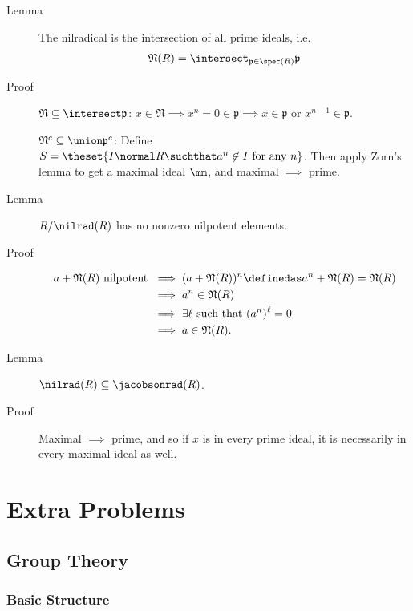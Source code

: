 \begin{description}
\item[Lemma]
The nilradical is the intersection of all prime ideals, i.e.
\begin{align*}
  \mathfrak{N}(R) = \intersect_{\mathfrak{p} \in \spec(R)} \mathfrak{p}
  \end{align*}
\item[Proof]
\(\mathfrak{N} \subseteq \intersect \mathfrak{p}\):
\(x \in \mathfrak{N} \implies x^n = 0 \in \mathfrak p \implies x\in \mathfrak{p} \text{ or } x^{n-1}\in\mathfrak p\).

\(\mathfrak{N}^c \subseteq \union \mathfrak{p}^c\): Define
\(S = \theset{I\normal R \suchthat a^n\not\in I \text{ for any } n}\).
Then apply Zorn's lemma to get a maximal ideal \(\mm\), and maximal
\(\implies\) prime.
\item[Lemma]
\(R/\mathfrak \nilrad(R)\) has no nonzero nilpotent elements.
\item[Proof]
\hfill

\begin{align*}
a + \mathfrak N(R)\text{ nilpotent } &\implies (a+ \mathfrak N(R))^n \definedas a^n + \mathfrak N(R)= \mathfrak N(R) \\
&\implies a^n \in \mathfrak N(R) \\
&\implies \exists \ell \text{ such that } (a^n)^\ell = 0 \\
&\implies a\in \mathfrak N(R)
.\end{align*}
\item[Lemma]
\(\mathfrak \nilrad (R) \subseteq \jacobsonrad(R)\).
\item[Proof]
Maximal \(\implies\) prime, and so if \(x\) is in every prime ideal, it
is necessarily in every maximal ideal as well.
\end{description}

\hypertarget{extra-problems}{%
\section{Extra Problems}\label{extra-problems}}

\hypertarget{group-theory-2}{%
\subsection{Group Theory}\label{group-theory-2}}

\hypertarget{basic-structure}{%
\subsubsection{Basic Structure}\label{basic-structure}}

